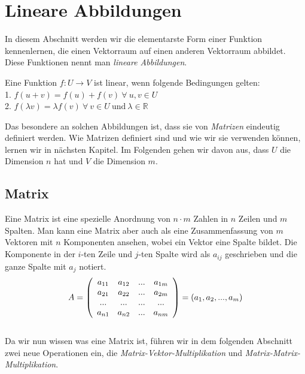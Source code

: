 
\section{Lineare Abbildungen}

In diesem Abschnitt werden wir die elementarste Form einer Funktion kennenlernen, die einen Vektorraum auf einen anderen Vektorraum abbildet. Diese Funktionen nennt man \textit{lineare Abbildungen}.
\begin{Def}
	\label{Def:Def_1}
Eine Funktion $f:U \stackrel{}{\rightarrow} V$ ist linear, wenn folgende Bedingungen gelten: \\ 
1. $f(u+v) = f(u)+f(v) \ \forall \ u,v \in U$\\
2. $f(\lambda v) = \lambda f(v) \ \forall \ v \in U \ \text{und} \ \lambda \in \mathbb{R}$
\end{Def}

Das besondere an solchen Abbildungen ist, dass sie von \textit{Matrizen} eindeutig definiert werden. Wie Matrizen definiert sind und wie wir sie verwenden können, lernen wir in nächsten Kapitel. Im Folgenden gehen wir davon aus, dass $U$ die Dimension $n$ hat und $V$ die Dimension $m$. 

\subsection{Matrix}
Eine Matrix ist eine spezielle Anordnung von $n\cdot m$ Zahlen in $n$ Zeilen und $m$ Spalten. Man kann eine Matrix aber auch als eine Zusammenfassung von $m$ Vektoren mit $n$ Komponenten ansehen, wobei ein Vektor eine Spalte bildet. Die Komponente in der $i$-ten Zeile und $j$-ten Spalte wird als $a_{ij}$ geschrieben und die ganze Spalte mit $a_j$ notiert.\\
\begin{equation*}
A= \left(
   \begin{array}{cccc}
	  a_{11} & a_{12} & ... & a_{1m}\\
		a_{21} & a_{22} & ... & a_{2m}\\
		...   & ...   & ... & ...  \\
		a_{n1} & a_{n2} & ... & a_{nm}
	 \end{array}
	 \right) = (a_1, a_2, ..., a_m)\\
\end{equation*}
\\
Da wir nun wissen was eine Matrix ist, führen wir in dem folgenden Abschnitt zwei neue Operationen ein, die \textit{Matrix-Vektor-Multiplikation} und \textit{Matrix-Matrix-Multiplikation}.

